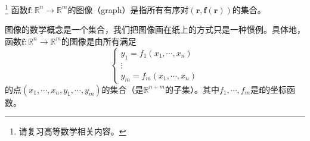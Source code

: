 \documentclass[main.tex]{subfiles}
\begin{document}
\begin{definition}[函数的图像]\footnote{请复习高等数学相关内容\cite[\S 6.4$\sim$\6.7]{华工高数2009上}。}
    函数$\mathbf{f}:\mathbb{R}^n\rightarrow\mathbb{R}^m$的图像（graph）是指所有有序对$\left(\mathbf{r},\mathbf{f}\left(\mathbf{r}\right)\right)$的集合。
\end{definition}

图像的数学概念是一个集合，我们把图像画在纸上的方式只是一种惯例。具体地，函数$\mathbf{f}:\mathbb{R}^n\rightarrow\mathbb{R}^m$的图像是由所有满足
\[
    \left\{\begin{array}{c}y_1=f_1\left(x_1,\cdots,x_n\right)\\\vdots\\y_m=f_m\left(x_1,\cdots,x_n\right)\end{array}\right.
\]
的点$\left(x_1,\cdots,x_n,y_1,\cdots,y_m\right)$的集合（是$\mathbb{R}^{n+m}$的子集）。其中$f_1,\cdots,f_m$是$\mathbf{f}$的坐标函数。
\end{document}
